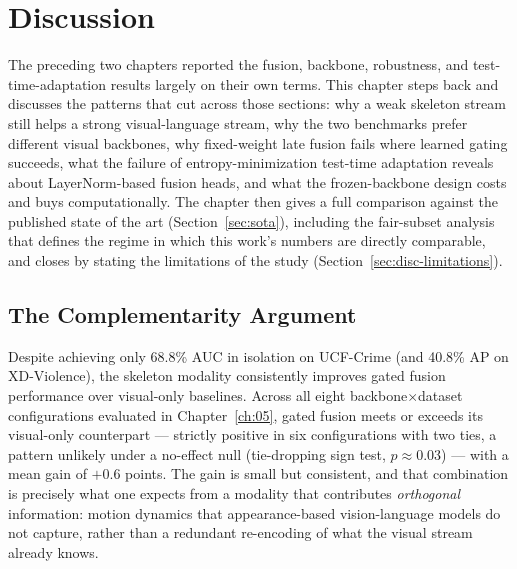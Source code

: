 \chapter{Discussion}
\label{ch:07}

The preceding two chapters reported the fusion, backbone, robustness, and
test-time-adaptation results largely on their own terms. This chapter steps
back and discusses the patterns that cut across those sections: why a weak
skeleton stream still helps a strong visual-language stream, why the two
benchmarks prefer different visual backbones, why fixed-weight late fusion
fails where learned gating succeeds, what the failure of entropy-minimization
test-time adaptation reveals about LayerNorm-based fusion heads, and what the
frozen-backbone design costs and buys computationally. The chapter then gives
a full comparison against the published state of the art
(Section~\ref{sec:sota}), including the fair-subset analysis that defines the
regime in which this work's numbers are directly comparable, and closes by
stating the limitations of the study (Section~\ref{sec:disc-limitations}).

\section{The Complementarity Argument}
\label{sec:disc-complementarity}

Despite achieving only 68.8\% AUC in isolation on UCF-Crime (and 40.8\% AP on
XD-Violence), the skeleton modality consistently improves gated fusion
performance over visual-only baselines. Across all eight
backbone$\times$dataset configurations evaluated in Chapter~\ref{ch:05}, gated
fusion meets or exceeds its visual-only counterpart --- strictly positive in
six configurations with two ties, a pattern unlikely under a no-effect null
(tie-dropping sign test, $p \approx 0.03$) --- with a mean gain of $+0.6$
points. The gain is small but consistent, and that combination is precisely
what one expects from a modality that contributes \emph{orthogonal}
information: motion dynamics that appearance-based vision-language models do
not capture, rather than a redundant re-encoding of what the visual stream
already knows.

